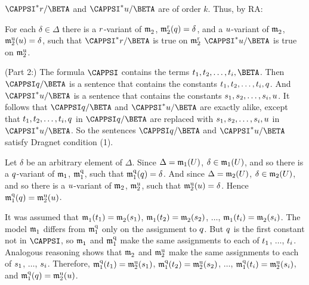 \begin{PROOF}
\begin{description}
\begin{description}
\begin{SUBPROOF}
	$\CAPPSI^*\variable{r}/\BETA$ and $\CAPPSI^*\variable{u}/\BETA$ are of order $k$.
    Thus, by RA:

	\begin{center}
		For each $\delta\in\Delta$ there is a $r$-variant of $\mathfrak{m^{\mathrm{}}_{\mathrm{2}}}$, $\mathfrak{m^{\mathrm{r}}_{\mathrm{2}}}(q)=\delta$, and a $u$-variant of $\mathfrak{m^{\mathrm{}}_{\mathrm{2}}}$, $\mathfrak{m^{\mathrm{u}}_{\mathrm{2}}}(u)=\delta$, such that $\CAPPSI^*\variable{r}/\BETA$ is true on $\mathfrak{m^{\mathrm{r}}_{\mathrm{2}}}$ \Iff $\CAPPSI^*\variable{u}/\BETA$ is true on $\mathfrak{m^{\mathrm{u}}_{\mathrm{2}}}$.
	\end{center}
	
	(Part 2:) The formula $\CAPPSI$ contains the terms $\variable{t}_1,\variable{t}_2,\ldots,\variable{t}_{\variable{i}},\BETA$.
	Then $\CAPPSI\variable{q}/\BETA$ is a sentence that contains the constants $t_1,t_2,\ldots,t_{i},q$.
	And $\CAPPSI^*\variable{u}/\BETA$ is a sentence that contains the constants $s_1,s_2,\ldots,s_{i},u$.
	It follows that $\CAPPSI\variable{q}/\BETA$ and $\CAPPSI^*\variable{u}/\BETA$ are exactly alike, except that $t_1,t_2,\ldots,t_{i},q$ in $\CAPPSI\variable{q}/\BETA$ are replaced with $s_1,s_2,\ldots,s_{i},u$ in $\CAPPSI^*\variable{u}/\BETA$.
	So the sentences $\CAPPSI\variable{q}/\BETA$ and $\CAPPSI^*\variable{u}/\BETA$ satisfy Dragnet condition (1).
	
	Let $\delta$ be an arbitrary element of $\Delta$.
	Since $\Delta=\mathfrak{m}_1(U)$, $\delta\in\mathfrak{m}_1(U)$, and so there is a $q$-variant of $\mathfrak{m}_1$, $\mathfrak{m^{\mathrm{q}}_{\mathrm{1}}}$, such that $\mathfrak{m^{\mathrm{q}}_{\mathrm{1}}}(q)=\delta$.
	And since $\Delta=\mathfrak{m}_2(U)$, $\delta\in\mathfrak{m}_2(U)$, and so there is a $u$-variant of $\mathfrak{m}_2$, $\mathfrak{m^{\mathrm{u}}_{\mathrm{2}}}$, such that $\mathfrak{m^{\mathrm{u}}_{\mathrm{2}}}(u)=\delta$.
	Hence $\mathfrak{m^{\mathrm{q}}_{\mathrm{1}}}(q)=\mathfrak{m^{\mathrm{u}}_{\mathrm{2}}}(u)$.

	It was assumed that $\mathfrak{m^{\mathrm{}}_{\mathrm{1}}}(t_1)=\mathfrak{m^{\mathrm{}}_{\mathrm{2}}}(s_1)$, $\mathfrak{m^{\mathrm{}}_{\mathrm{1}}}(t_2)=\mathfrak{m^{\mathrm{}}_{\mathrm{2}}}(s_2)$, $\ldots$, $\mathfrak{m^{\mathrm{}}_{\mathrm{1}}}(t_{i})=\mathfrak{m^{\mathrm{}}_{\mathrm{2}}}(s_{i})$.
	The model $\mathfrak{m^{\mathrm{}}_{\mathrm{1}}}$ differs from $\mathfrak{m^{\mathrm{q}}_{\mathrm{1}}}$ only on the assignment to $q$.
	But $q$ is the first constant not in $\CAPPSI$, so $\mathfrak{m^{\mathrm{}}_{\mathrm{1}}}$ and $\mathfrak{m^{\mathrm{q}}_{\mathrm{1}}}$ make the same assignments to each of $t_1$, $\ldots$, $t_i$.
	Analogous reasoning shows that $\mathfrak{m^{\mathrm{}}_{\mathrm{2}}}$ and $\mathfrak{m^{\mathrm{u}}_{\mathrm{2}}}$ make the same assignments to each of $s_1$, $\ldots$, $s_i$.
	Therefore, $\mathfrak{m^{\mathrm{q}}_{\mathrm{1}}}(t_1)=\mathfrak{m^{\mathrm{u}}_{\mathrm{2}}}(s_1)$, $\mathfrak{m^{\mathrm{q}}_{\mathrm{1}}}(t_2)=\mathfrak{m^{\mathrm{u}}_{\mathrm{2}}}(s_2)$, $\ldots$, $\mathfrak{m^{\mathrm{q}}_{\mathrm{1}}}(t_{i})=\mathfrak{m^{\mathrm{u}}_{\mathrm{2}}}(s_{i})$, and $\mathfrak{m^{\mathrm{q}}_{\mathrm{1}}}(q)=\mathfrak{m^{\mathrm{u}}_{\mathrm{2}}}(u)$.
	

\end{SUBPROOF}
\end{description}
\end{description}
\end{PROOF}
